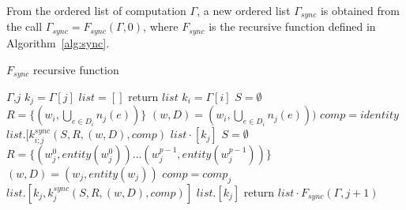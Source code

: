 \begin{mydef}
From the ordered list of computation $\Gamma$, a new ordered list $\Gamma_{sync}$ is obtained from the call $\Gamma_{sync} = F_{sync}(\Gamma,0)$, where $F_{sync}$ is the recursive function defined in Algorithm~\ref{alg:sync}.

\end{mydef}

\begin{algorithm}
\caption{$F_{sync}$ recursive function}
\label{alg:sync}
\begin{algorithmic}[1]
 {$\Gamma$,$j$}
\State $k_j = \Gamma[j]$
\State $list = []$
\State return $list$
\State $k_i = \Gamma[i]$
\State $S = \emptyset$
\State $R = \{(w_i,\bigcup_{e \in D_i} n_j(e))\}$
\State $(w,D) = (w_i,\bigcup_{e \in D_i} n_j(e)))$
\State $comp = identity$
\State $list.[k_{i;j}^{sync}(S,R,(w,D),comp)$
\EndIf
\EndFor
\State $list \cdot [k_j]$
\State $S = \emptyset$
\State $R = \{(w^0_j,entity(w^0_j)) \dots (w^{p-1}_j,entity(w^{p-1}_j))\}$
\State $(w,D) = (w_j,entity(w_j))$
\State $comp = comp_j$
\State $list.[k_j, k_{j}^{sync}(S,R,(w,D),comp)]$
\Else
\State $list.[k_j]$
\EndIf
\State return $list \cdot F_{sync}(\Gamma,j+1)$
\EndProcedure
\end{algorithmic}
\end{algorithm}


